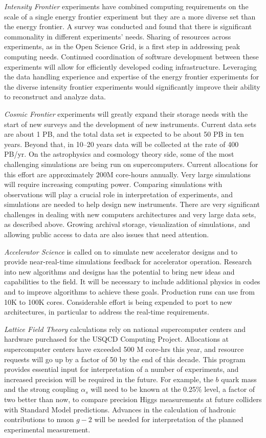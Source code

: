 {\it Intensity Frontier} experiments have combined computing requirements
on the scale of a single energy frontier experiment but they are a more
diverse set than the energy frontier. A survey was conducted and found that
there is significant commonality in different experiments' needs. Sharing of
resources across experiments, as in the Open Science Grid, is a first step
in addressing peak computing needs.  Continued coordination of
software development between these experiments will allow for efficiently
developed coding infrastructure.  Leveraging the data handling experience and
expertise of the energy frontier experiments for the diverse intensity
frontier experiments would significantly improve their ability to reconstruct
and analyze data.

{\it Cosmic Frontier} experiments will greatly expand their storage needs
with the start of new surveys and the development of new instruments.
Current data sets are about 1 PB, and the total data set is expected to be
about 50 PB in ten years. Beyond that, in 10--20 years data will be
collected at the rate of 400 PB/yr. On the astrophysics and cosmology
theory side, some of the most challenging simulations are being run on
supercomputers. 
Current allocations for this effort are approximately 200M core-hours annually.
Very large simulations will require increasing computing
power. Comparing simulations with observations will play a crucial role in
interpretation of experiments, and simulations are needed to help design
new instruments. There are very significant challenges in dealing with new
computers architectures and very large data sets, as described above.
Growing archival storage, visualization of simulations, and allowing public
access to data are also issues that need attention.

{\it Accelerator Science} is called on to simulate new accelerator designs
and to provide near-real-time simulations feedback for accelerator
operation. 
Research into new algorithms and designs has the potential to bring new ideas and
capabilities to the field.
It will be necessary to include additional physics in codes and
to improve algorithms to achieve these goals. Production runs can use from
10K to 100K cores. Considerable effort is being expended to port to new
architectures, in particular to address the real-time requirements.

{\it Lattice Field Theory} calculations rely on national supercomputer
centers and hardware purchased for the USQCD Computing Project. Allocations
at supercomputer centers have exceeded 500 M core-hrs this year, and
resource requests will go up by a factor of 50 by the end of this decade.
This program provides essential input for interpretation of a number of
experiments, and increased precision will be required in the future. For
example, the $b$ quark mass and the strong coupling $\alpha_s$ will need to
be known at the 0.25\% level, a factor of two better than now, to compare
precision Higgs measurements at future colliders with 
Standard Model predictions.  Advances
in the calculation of hadronic contributions to muon $g-2$ will be needed
for interpretation of the planned experimental measurement.

